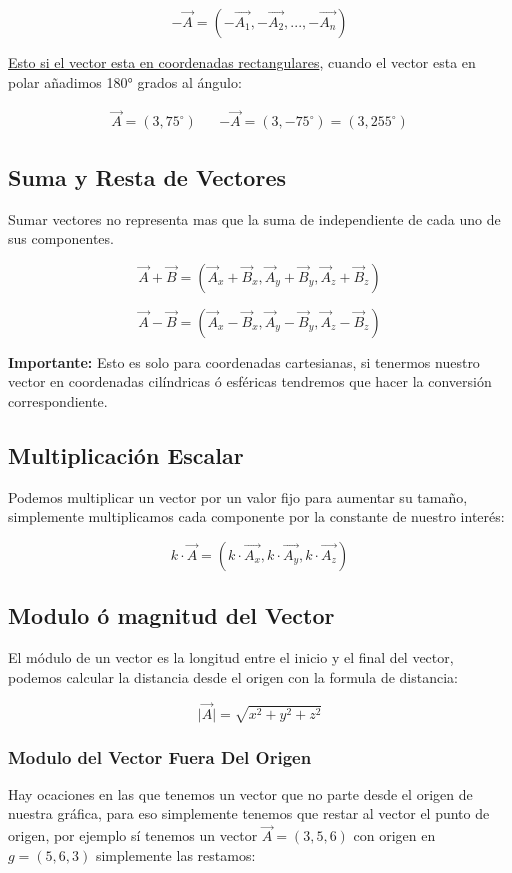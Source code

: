 \documentclass{article}
\begin{document}
\[
-\vec{A} = (-\vec{A_1},-\vec{A_2},...,-\vec{A_n})
\]

\uline{Esto si el vector esta en coordenadas rectangulares}, cuando el vector esta en polar añadimos 180° grados al ángulo: 

\[ \begin{aligned}
\vec{A} = (3,75^\circ) && -\vec{A} = (3,-75^\circ) = (3,255^\circ)
\end{aligned} \]

\subsection{Suma y Resta de Vectores}
\label{sec:org4012e86}
Sumar vectores no representa mas que la suma de independiente de cada uno de sus componentes.

\[
\vec{A} + \vec{B} = (\vec{A}_x + \vec{B}_x,\vec{A}_y + \vec{B}_y,\vec{A}_z + \vec{B}_z)
\]

\[
\vec{A} - \vec{B} = (\vec{A}_x - \vec{B}_x,\vec{A}_y - \vec{B}_y,\vec{A}_z - \vec{B}_z)
\]

\textbf{Importante:} Esto es solo para coordenadas cartesianas, si tenermos nuestro vector en coordenadas cilíndricas ó esféricas tendremos que hacer la conversión correspondiente.

\subsection{Multiplicación Escalar}
\label{sec:orgb432e5f}
Podemos multiplicar un vector por un valor fijo para aumentar su tamaño, simplemente multiplicamos cada componente por la constante de nuestro interés:

\[
k \cdot \vec{A} = (k\cdot\vec{A_x},k\cdot\vec{A_y},k\cdot\vec{A_z})
\]

\subsection{Modulo ó magnitud del Vector}
\label{sec:org720e1fd}
El módulo de un vector es la longitud entre el inicio y el final del vector, podemos calcular la distancia desde el origen con la formula de distancia:

\[
\vert\vec{A}\vert = \sqrt{ x^2 + y^2 + z^2 }
\]

\subsubsection*{Modulo del Vector Fuera Del Origen}
\label{sec:orge356455}
Hay ocaciones en las que tenemos un vector que no parte desde el origen de nuestra gráfica, para eso simplemente tenemos que restar al vector el punto de origen, por ejemplo sí tenemos un vector \(\vec{A} = (3,5,6)\) con origen en \(g = (5,6,3)\) simplemente las restamos:
\end{document}
